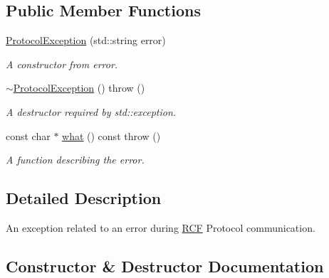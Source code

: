 \subsection*{Public Member Functions}
\begin{DoxyCompactItemize}
\item 
\hyperlink{class_r_c_f_1_1_common_1_1_protocol_exception_aa32f723d59444c644cb5ed4fe8ceaefc}{Protocol\+Exception} (std\+::string error)
\begin{DoxyCompactList}\small\item\em A constructor from error. \end{DoxyCompactList}\item 
\hypertarget{class_r_c_f_1_1_common_1_1_protocol_exception_a7a3b9c69b7da24d3891c76e7b12508c3}{}\hyperlink{class_r_c_f_1_1_common_1_1_protocol_exception_a7a3b9c69b7da24d3891c76e7b12508c3}{$\sim$\+Protocol\+Exception} ()  throw ()\label{class_r_c_f_1_1_common_1_1_protocol_exception_a7a3b9c69b7da24d3891c76e7b12508c3}

\begin{DoxyCompactList}\small\item\em A destructor required by std\+::exception. \end{DoxyCompactList}\item 
const char $\ast$ \hyperlink{class_r_c_f_1_1_common_1_1_protocol_exception_a2fa21d12baab457ceb141f1c37aa2453}{what} () const   throw ()
\begin{DoxyCompactList}\small\item\em A function describing the error. \end{DoxyCompactList}\end{DoxyCompactItemize}


\subsection{Detailed Description}
An exception related to an error during \hyperlink{namespace_r_c_f}{R\+C\+F} Protocol communication. 

\subsection{Constructor \& Destructor Documentation}
\hypertarget{class_r_c_f_1_1_common_1_1_protocol_exception_aa32f723d59444c644cb5ed4fe8ceaefc}{}
